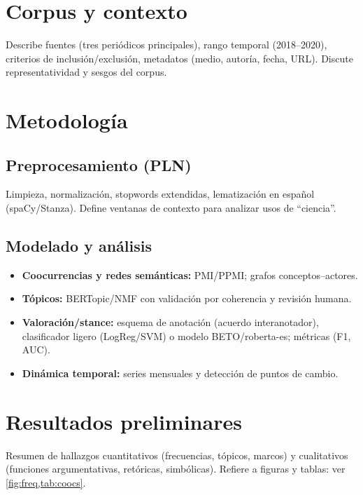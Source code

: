 \documentclass[11pt,a4paper]{article}
\begin{document}
	\section{Corpus y contexto}
	Describe fuentes (tres periódicos principales), rango temporal (2018--2020), criterios de inclusión/exclusión, metadatos (medio, autoría, fecha, URL). Discute representatividad y sesgos del corpus.
	
	\section{Metodología}
	\subsection{Preprocesamiento (PLN)}
	Limpieza, normalización, stopwords extendidas, lematización en español (spaCy/Stanza). 
	Define ventanas de contexto para analizar usos de “ciencia”.
	
	\subsection{Modelado y análisis}
	\begin{itemize}
		\item \textbf{Coocurrencias y redes semánticas:} PMI/PPMI; grafos conceptos–actores.
		\item \textbf{Tópicos:} BERTopic/NMF con validación por coherencia y revisión humana.
		\item \textbf{Valoración/stance:} esquema de anotación (acuerdo interanotador), clasificador ligero (LogReg/SVM) o modelo BETO/roberta-es; métricas (F1, AUC).
		\item \textbf{Dinámica temporal:} series mensuales y detección de puntos de cambio.
	\end{itemize}
	
	\section{Resultados preliminares}
	Resumen de hallazgos cuantitativos (frecuencias, tópicos, marcos) y cualitativos (funciones argumentativas, retóricas, simbólicas). 
	Refiere a figuras y tablas: ver \cref{fig:freq,tab:coocs}.
	
	
\end{document}
